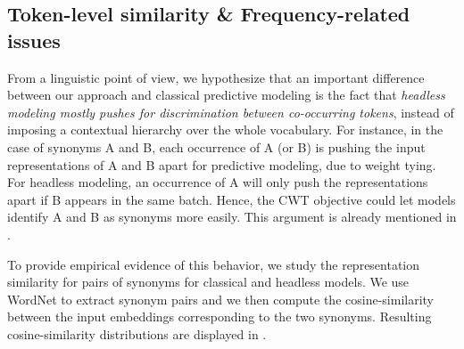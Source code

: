 \subsection{Token-level similarity \& Frequency-related issues}
From a linguistic point of view, we hypothesize that an important difference between our approach and classical predictive modeling is the fact that \textit{headless modeling mostly pushes for discrimination between co-occurring tokens}, instead of imposing a contextual hierarchy over the whole vocabulary. For instance, in the case of synonyms A and B, each occurrence of A (or B) is pushing the input representations of A and B apart for predictive modeling, due to weight tying. For headless modeling, an occurrence of A will only push the representations apart if B appears in the same batch. Hence, the CWT objective could let models identify A and B as synonyms more easily. This argument is already mentioned in \citet{jean-etal-2015-using}.

To provide empirical evidence of this behavior, we study the representation similarity for pairs of synonyms for classical and headless models. 
We use WordNet \citep{Fellbaum1998} to extract synonym pairs and we then compute the cosine-similarity between the input embeddings corresponding to the two synonyms.
Resulting cosine-similarity distributions are displayed in .

